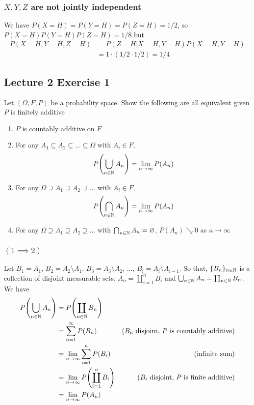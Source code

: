 \documentclass{article}
\begin{document}
\subsubsection{$X, Y, Z$ are not jointly independent}

We have $P(X=H) = P(Y=H) = P(Z=H) = 1/2$, so $P(X=H)P(Y=H)P(Z=H) = 1/8$ but
\begin{align*}
    P(X=H, Y=H, Z=H)
    &= P(Z=H | X=H, Y=H) P(X=H, Y=H) \\
    &= 1 \cdot (1/2 \cdot 1/2) = 1/4
\end{align*}

\subsection{Lecture 2 Exercise 1}

Let $(\Omega, F, P)$ be a probability space. Show the following are all equivalent given $P$ is finitely additive

\begin{enumerate}
    \item $P$ is countably additive on $F$

    \item For any $A_1 \subseteq A_2 \subseteq ... \subseteq \Omega$ with $A_i \in F$,
    $$
        P \tuple*{\bigcup_{n \in \N} A_n} = \lim_{n \to \infty} P(A_n)
    $$

    \item For any $\Omega \supseteq A_1 \supseteq A_2 \supseteq ...$ with $A_i \in F$,
    $$
        P \tuple*{\bigcap_{n \in \N} A_n} = \lim_{n \to \infty} P(A_n)
    $$

    \item For any $\Omega \supseteq A_1 \supseteq A_2 \supseteq ...$ with $\bigcap_{n \in \mathbb{N}} A_n = \varnothing$, $P(A_n) \searrow 0$ as $n \to \infty$
\end{enumerate}

\subsubsection{$(1 \implies 2)$}

Let $B_1 = A_1$, $B_2 = A_2 \setminus A_1$, $B_3 = A_3 \setminus A_2$, ..., $B_i = A_i \setminus A_{i-1}$. So that, $\{B_n\}_{n \in \mathbb{N}}$ is a collection of disjoint measurable sets, $A_n = \coprod_{i=1}^n B_i$ and $\bigcup_{n \in \mathbb{N}} A_n = \coprod_{n \in \mathbb{N}} B_n$. We have
\begin{align*}
    P \tuple*{\bigcup_{n \in \N} A_n}
    &= P \tuple*{\coprod_{n \in \N} B_n} \\
    &= \sum_{n=1}^\infty P(B_n) &\text{($B_n$ disjoint, $P$ is countably additive)} \\
    &= \lim_{n \to \infty} \sum_{i=1}^n P(B_i) &\text{(infinite sum)} \\
    &= \lim_{n \to \infty} P \tuple*{\coprod_{i = 1}^n B_i} &\text{($B_i$ disjoint, $P$ is finite additive)} \\
    &= \lim _{n \to \infty} P(A_n)
\end{align*}
\end{document}
